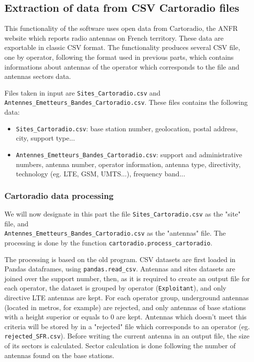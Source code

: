 \documentclass[a4paper, 11pt]{report}
\begin{document}
    \subsection{Extraction of data from CSV Cartoradio files}
    This functionality of the software uses open data from Cartoradio, the ANFR website which reports radio antennas on French territory. These data are exportable in classic CSV format. The functionality produces several CSV file, one by operator, following the format used in previous parts, which contains informations about antennas of the operator which corresponds to the file and antennas sectors data. \newline
    
    Files taken in input are \texttt{Sites\_Cartoradio.csv} and \texttt{Antennes\_Emetteurs\_Bandes\_Cartoradio.csv}. These files contains the following data:
    
    \begin{itemize}
        \item \texttt{Sites\_Cartoradio.csv}: base station number, geolocation, postal address, city, support type...
        \item \texttt{Antennes\_Emetteurs\_Bandes\_Cartoradio.csv}: support and administrative numbers, antenna number, operator information, antenna type, directivity, technology (eg. LTE, GSM, UMTS...), frequency band...
    \end{itemize}
    
    \subsubsection{Cartoradio data processing}
    We will now designate in this part the file \texttt{Sites\_Cartoradio.csv} as the "site" file, and \\ \texttt{Antennes\_Emetteurs\_Bandes\_Cartoradio.csv} as the "antennas" file. The processing is done by the function \texttt{cartoradio.process\_cartoradio}.\newline
    
    The processing is based on the old program. \cite{trieu_visualization_2019}
    CSV datasets are first loaded in Pandas dataframes, using \texttt{pandas.read\_csv}. Antennas and sites datasets are joined over the support number, then, as it is required to create an output file for each operator, the dataset is grouped by operator (\texttt{Exploitant}), and only directive LTE antennas are kept. For each operator group, underground antennas (located in metros, for example) are rejected, and only antennas of base stations with a height superior or equals to 0 are kept. Antennas which doesn't meet this criteria will be stored by in a "rejected" file which corresponds to an operator (eg. \texttt{rejected\_SFR.csv}). Before writing the current antenna in an output file, the size of its sectors is calculated. Sector calculation is done following the number of antennas found on the base stations. \newline
    
\end{document}
